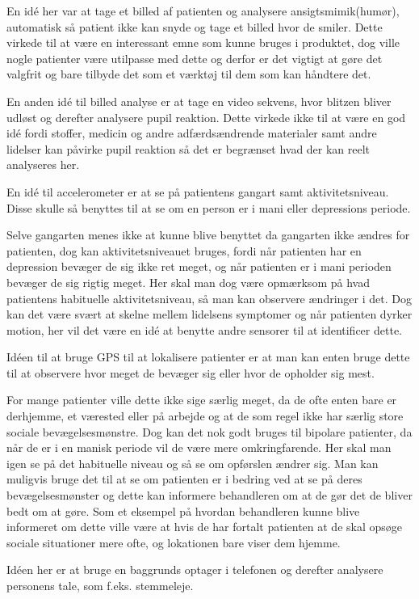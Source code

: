 \begin{description}[style=nextline]
\item[Billed analyse]
	En idé her var at tage et billed af patienten og analysere ansigtsmimik(humør), automatisk så patient ikke kan snyde og tage et billed hvor de smiler.
	Dette virkede til at være en interessant emne som kunne bruges i produktet, dog ville nogle patienter være utilpasse med dette og derfor er det vigtigt at gøre det valgfrit og bare tilbyde det som et værktøj til dem som kan håndtere det.
	
	En anden idé til billed analyse er at tage en video sekvens, hvor blitzen bliver udløst og derefter analysere pupil reaktion.
	Dette virkede ikke til at være en god idé fordi stoffer, medicin og andre adfærdsændrende materialer samt andre lidelser kan påvirke pupil reaktion så det er begrænset hvad der kan reelt analyseres her.
\item[Accelerometer]
	En idé til accelerometer er at se på patientens gangart samt aktivitetsniveau. Disse skulle så benyttes til at se om en person er i mani eller depressions periode.
	
	Selve gangarten menes ikke at kunne blive benyttet da gangarten ikke ændres for patienten, dog kan aktivitetsniveauet bruges, fordi når patienten har en depression bevæger de sig ikke ret meget, og når patienten er i mani perioden bevæger de sig rigtig meget. 
	Her skal man dog være opmærksom på hvad patientens habituelle aktivitetsniveau, så man kan observere ændringer i det.
	Dog kan det være svært at skelne mellem lidelsens symptomer og når patienten dyrker motion, her vil det være en idé at benytte andre sensorer til at identificer dette.
\item[Lokation]
	Idéen til at bruge GPS til at lokalisere patienter er at man kan enten bruge dette til at observere hvor meget de bevæger sig eller hvor de opholder sig mest. 
	
	For mange patienter ville dette ikke sige særlig meget, da de ofte enten bare er derhjemme, et værested eller på arbejde og at de som regel ikke har særlig store sociale bevægelsesmønstre. 
	Dog kan det nok godt bruges til bipolare patienter, da når de er i en manisk periode vil de være mere omkringfarende. 
	Her skal man igen se på det habituelle niveau og så se om opførslen ændrer sig. 
	Man kan muligvis bruge det til at se om patienten er i bedring ved at se på deres bevægelsesmønster og dette kan informere behandleren om at de gør det de bliver bedt om at gøre. 
	Som et eksempel på hvordan behandleren kunne blive informeret om dette ville være at hvis de har fortalt patienten at de skal opsøge sociale situationer mere ofte, og lokationen bare viser dem hjemme.
\item[Lyd]
	Idéen her er at bruge en baggrunds optager i telefonen og derefter analysere personens tale, som f.eks. stemmeleje. 
	

\end{description}
